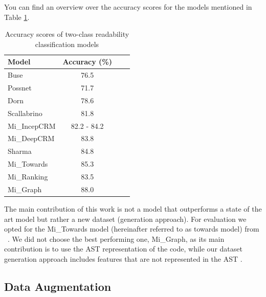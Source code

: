 \documentclass[%
class=scrreprt,
chapterprefix=false,%
open=right,%
twoside=false,%
paper=a4,%
logofile={Logo\_zentral\_farbig\_EN.png},%
thesistype=master,%
UKenglish,%
]{se2thesis}
\theoremstyle{definition}
\begin{document}
	You can find an overview over the accuracy scores for the models mentioned in Table \ref{tab:rel-acc-scores}.
	\begin{table}[ht]
		\centering
		\begin{tabular}{lccc}
			\toprule
			\textbf{Model} & \textbf{Accuracy (\%)} \\
			\midrule
			Buse \cite{buse2009learning} & 76.5 \\
			Possnet \cite{posnett2011simpler} & 71.7 \\
			Dorn \cite{dorn2012general} & 78.6 \\
			Scallabrino \cite{scalabrino2016improving} & 81.8 \\
			Mi\_IncepCRM \cite{mi2018inception} & 82.2 - 84.2 \\
			Mi\_DeepCRM \cite{mi2018improving} & 83.8 \\
			Sharma \cite{sharma2020egan} & 84.8 \\
			Mi\_Towards \cite{mi2022towards} & 85.3 \\
			Mi\_Ranking \cite{mi2022rank} & 83.5 \\
			Mi\_Graph \cite{mi2023graph} & 88.0 \\
			
			\bottomrule
		\end{tabular}
		\caption{Accuracy scores of two-class readability classification models}
		\label{tab:rel-acc-scores}
	\end{table}
	
	The main contribution of this work is not a model that outperforms a state of the art model but rather a new dataset (generation approach). For evaluation we opted for the Mi\_Towards model (hereinafter referred to as towards model) from \citeauthor{mi2022towards}~\cite{mi2022towards}. We did not choose the best performing one, Mi\_Graph, as its main contribution is to use the AST representation of the code, while our dataset generation approach includes features that are not represented in the AST \cite{mi2023graph}.
			
\subsection{Data Augmentation} \label{Data Augmentation}
\end{document}
